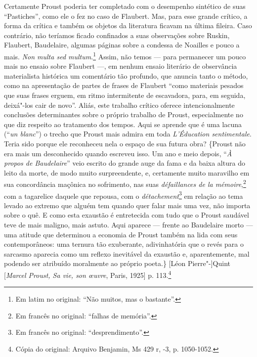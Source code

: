 Certamente Proust poderia ter completado com o desempenho sintético de
suas ``Pastiches'', como ele o fez no caso de Flaubert. Mas, para esse
grande crítico, a forma da crítica e também os objetos da literatura
ficavam na última fileira. Caso contrário, não teríamos ficado
confinados a suas observações sobre Ruskin, Flaubert, Baudelaire,
algumas páginas sobre a condessa de Noailles e pouco a mais. \emph{Non
multa sed multum}.\footnote{Em latim no original: ``Não muitos,
  mas o bastante''. \versal{[N. T.]}} Assim, não temos --- para permanecer um pouco mais
no ensaio sobre Flaubert ---, em nenhum ensaio literário de observância
materialista histórica um comentário tão profundo, que anuncia tanto o
método, como na apresentação de partes de frases de Flaubert ``como
materiais pesados que suas frases erguem, em ritmo intermitente de
escavadora, para, em seguida, deixá"-los cair de novo''. Aliás, este
trabalho crítico oferece intencionalmente conclusões determinantes sobre
o próprio trabalho de Proust, especialmente no que diz respeito ao
tratamento dos tempos. Aqui se aprende que é uma lacuna (``\emph{un
blanc}'') o trecho que Proust mais admira em toda \emph{L'Éducation
sentimentale}. Teria sido porque ele reconheceu nela o espaço de sua
futura obra? \{Proust não era mais um desconhecido quando escreveu isso.
Um ano e meio depois, ``\emph{À propos de Baudelaire}'' veio escrito do
grande auge da fama e da baixa altura do leito da morte, de modo muito
surpreendente, e, certamente muito maravilho em sua concordância
maçônica no sofrimento, nas suas \emph{défaillances de la
mémoire},\footnote{Em francês no original: ``falhas de memória''. \versal{[N. T.]}}
com a tagarelice daquele que repousa, com o \emph{détachement}\footnote{Em francês no original: ``desprendimento''. \versal{[N. T.]}} em
relação ao tema levado ao extremo que alguém tem quando quer falar mais uma
vez, não importa sobre o quê. E como esta exaustão é entretecida com
tudo que o Proust saudável teve de mais maligno, mais astuto. Aqui
aparece --- frente ao Baudelaire morto --- uma atitude que determinou a
economia de Proust também na lida com seus contemporâneos: uma ternura
tão exuberante, adivinhatória que o revés para o sarcasmo aparecia como
um reflexo inevitável da exaustão e, aparentemente, mal podendo ser
atribuído moralmente ao próprio poeta.\} {[}Léon Pierre"-{]}Quint
{[}\emph{Marcel Proust, Sa vie, son \oe uvre}, Paris, 1925{]} p. 113.\footnote{Cópia do original: Arquivo Benjamin, Ms 429 r, -3, p. 1050-1052.}

